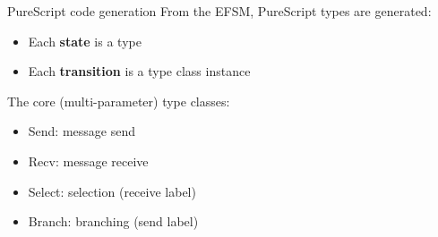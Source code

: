\documentclass[aspectratio=1610]{beamer}
\begin{document}
\begin{frame}{PureScript code generation}
  From the EFSM, PureScript types are generated:
  \begin{itemize}
    \item Each \textbf{state} is a type
    \item Each \textbf{transition} is a type class instance
  \end{itemize}

  The core (multi-parameter) type classes:
  \begin{itemize}
    \item Send: message send
    \item Recv: message receive
    \item Select: selection (receive label)
    \item Branch: branching (send label)
  \end{itemize}
\end{frame}
\end{document}
